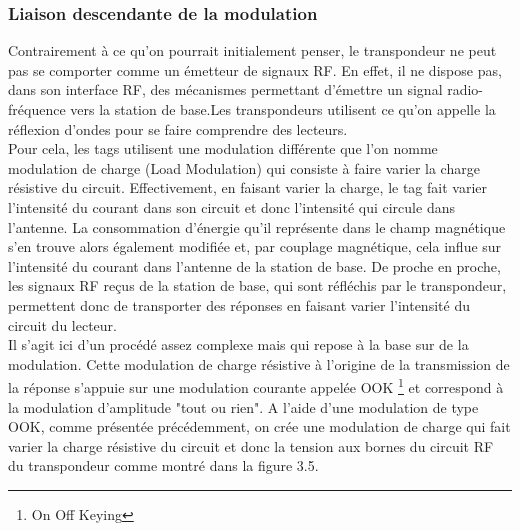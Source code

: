\documentclass[11pt, a4paper, twoside]{book}
\begin{document}
\subsubsection{Liaison descendante de la modulation}
Contrairement à ce qu'on pourrait initialement penser, le transpondeur ne peut pas se comporter comme un émetteur de signaux RF. En effet, il ne dispose pas, dans son interface RF, des mécanismes permettant d'émettre un signal radio-fréquence vers la station de base.Les transpondeurs utilisent ce qu'on appelle la réflexion d'ondes pour se faire comprendre des lecteurs. \\

Pour cela, les tags utilisent une modulation différente que l'on nomme modulation de charge (Load Modulation) qui consiste à faire varier la charge résistive du circuit. Effectivement, en faisant varier la charge, le tag fait varier l'intensité du courant dans son circuit et donc l'intensité qui circule dans l'antenne. La consommation d'énergie qu'il représente dans le champ magnétique s'en trouve alors également modifiée et, par couplage magnétique, cela influe sur l'intensité du courant dans l'antenne de la station de base. De proche en proche, les signaux RF reçus de la station de base, qui sont réfléchis par le transpondeur, permettent donc de transporter des réponses en faisant varier l'intensité du circuit du lecteur.\\

Il s'agit ici d'un procédé assez complexe mais qui repose à la base sur de la modulation. Cette modulation de charge résistive à l'origine de la transmission de la réponse s'appuie sur une modulation courante appelée OOK \footnote{On Off Keying} et correspond à la modulation d'amplitude "tout ou rien". A l'aide d'une modulation de type OOK, comme présentée précédemment, on crée une modulation de charge qui fait varier la charge résistive du circuit et donc la tension aux bornes du circuit RF du transpondeur comme montré dans la figure 3.5.\\
\end{document}
